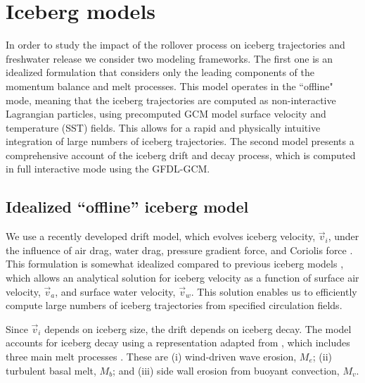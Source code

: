 \documentclass[twocol]{ametsoc_tw}
\newcommand{\be}[0]{\begin{equation}}
\newcommand{\ee}[0]{\end{equation}}
\newcommand{\vi}{\vec{v}_i}
\newcommand{\vw}{\vec{v}_w}
\newcommand{\va}{\vec{v}_a}
\newcommand{\kv}{\hat{k}}
\begin{document}
\section{Iceberg models} \label{sec:model}

In order to study the impact of the rollover process on iceberg trajectories and freshwater release we consider two modeling frameworks. The first one is an idealized formulation that considers only the leading components of the momentum balance and melt processes. This model operates in the ``offline" mode, meaning that the iceberg trajectories are computed as non-interactive Lagrangian particles, using precomputed GCM model surface velocity and temperature (SST) fields. This allows for a rapid and physically intuitive integration of large numbers of iceberg trajectories. The second model presents a comprehensive account of the iceberg drift and decay process, which is computed in full interactive mode using the GFDL-GCM. 

\subsection{Idealized ``offline'' iceberg model}
We use a recently developed drift model, which evolves iceberg velocity, $\vi$, under the influence of air drag, water drag, pressure gradient force, and Coriolis force \citep{WED16}. This formulation is somewhat idealized compared to previous iceberg models \citep[e.g.,][]{Bigg:1997bp,Gladstone:2001cq,Roberts:2014ff}, which allows an analytical solution for iceberg velocity as a function of surface air velocity, $\va$, and surface water velocity, $\vw$. 
This solution enables us to efficiently compute large numbers of iceberg trajectories from specified circulation fields.

Since $\vi$ depends on iceberg size, the drift depends on iceberg decay. The model accounts for iceberg decay using a representation adapted from \citet{Bigg:1997bp}, which includes three main melt processes \citep{WED16}. These are (i) wind-driven wave erosion, $M_e$; (ii) turbulent basal melt, $M_b$; and (iii) side wall erosion from buoyant convection, $M_v$. 
\end{document}
